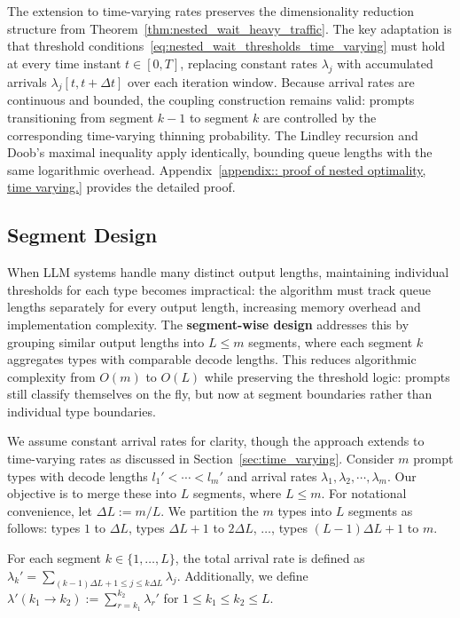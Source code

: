 The extension to time-varying rates preserves the dimensionality reduction structure from Theorem~\ref{thm:nested_wait_heavy_traffic}. The key adaptation is that threshold conditions~\eqref{eq:nested_wait_thresholds_time_varying} must hold at every time instant $t \in [0,T]$, replacing constant rates $\lambda_j$ with accumulated arrivals $\lambda_j[t, t+\Delta t]$ over each iteration window. Because arrival rates are continuous and bounded, the coupling construction remains valid: prompts transitioning from segment \(k-1\) to segment \(k\) are controlled by the corresponding time-varying thinning probability. The Lindley recursion and Doob's maximal inequality apply identically, bounding queue lengths with the same logarithmic overhead. Appendix~\ref{appendix:: proof of nested optimality, time varying.} provides the detailed proof.

\subsection{Segment Design}\label{sec:segment_design}

When LLM systems handle many distinct output lengths, maintaining individual thresholds for each type becomes impractical: the algorithm must track queue lengths separately for every output length, increasing memory overhead and implementation complexity. The \textbf{segment-wise design} addresses this by grouping similar output lengths into $L \leq m$ segments, where each segment $k$ aggregates types with comparable decode lengths. This reduces algorithmic complexity from $O(m)$ to $O(L)$ while preserving the threshold logic: prompts still classify themselves on the fly, but now at segment boundaries rather than individual type boundaries.

We assume constant arrival rates for clarity, though the approach extends to time-varying rates as discussed in Section~\ref{sec:time_varying}. Consider $m$ prompt types with decode lengths $l_1' < \cdots < l_m'$ and arrival rates $\lambda_1, \lambda_2, \cdots, \lambda_m$. Our objective is to merge these into $L$ segments, where $L \leq m$. For notational convenience, let $\Delta L:= m/L$. We partition the $m$ types into $L$ segments as follows: types $1$ to $\Delta L$, types $\Delta L+ 1$ to $2\Delta L$, $\dots$, types $(L-1)\Delta L+ 1$ to $m$.

For each segment $k \in \{1, \dots, L\}$, the total arrival rate is defined as $\lambda_k' = \sum_{(k-1)\Delta L+1\le j\le k\Delta L} \lambda_j$. Additionally, we define $\lambda'(k_1 \to k_2) := \sum_{r=k_1}^{k_2} \lambda_r'$ for $1 \leq k_1 \leq k_2 \leq L$.

